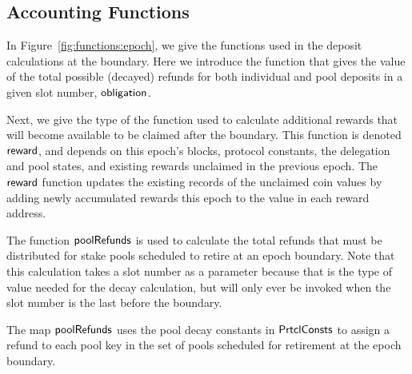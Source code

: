\subsection{Accounting Functions}
\label{sec:acc-fun}

In Figure~\ref{fig:functions:epoch}, we give the functions
used in the deposit calculations at the boundary. Here we introduce the function
that gives the value of the total possible (decayed) refunds for both individual and
pool deposits in a given slot number, $\mathsf{obligation}$.

Next, we give the type of the function used to calculate additional rewards that will become
available to be claimed after the boundary. This function is denoted $\mathsf{reward}$,
and depends on this epoch's blocks, protocol constants, the delegation
and pool states, and existing rewards unclaimed in the previous epoch.
The $\mathsf{reward}$ function
updates the existing records of the unclaimed coin values by adding newly
accumulated rewards this epoch to the value in each reward address.

The function $\mathsf{poolRefunds}$ is used to calculate the total refunds
that must be distributed
for stake pools scheduled to retire at an epoch boundary. Note that this
calculation takes a slot number as a parameter because that is the type of value
needed for the decay calculation, but will only ever be invoked
when the slot number is the last before the boundary.

The map $\mathsf{poolRefunds}$ uses the pool decay constants in $\mathsf{PrtclConsts}$
to assign a refund to each pool key in the set of pools scheduled for retirement
at the epoch boundary.

